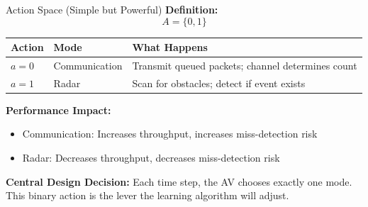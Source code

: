 \documentclass{beamer}
\begin{document}
\begin{frame}{Action Space (Simple but Powerful)}
  \textbf{Definition:}
  $$A = \{0, 1\}$$

  \vspace{0.2cm}
  \scriptsize
  \begin{center}
    \begin{tabular}{|p{1.2cm}|p{1.8cm}|p{4.2cm}|}
      \hline
      \textbf{Action} & \textbf{Mode} & \textbf{What Happens} \\
      \hline
      $a = 0$ & Communication & Transmit queued packets; channel determines count \\
      \hline
      $a = 1$ & Radar & Scan for obstacles; detect if event exists \\
      \hline
    \end{tabular}
  \end{center}

  \vspace{0.15cm}
  \normalsize
  \textbf{Performance Impact:}
  \small
  \begin{itemize}
    \setlength{\itemsep}{0.05cm}
    \item Communication: Increases throughput, increases miss-detection risk
    \item Radar: Decreases throughput, decreases miss-detection risk
  \end{itemize}

  \vspace{0.1cm}
  \small\textbf{Central Design Decision:} Each time step, the AV chooses exactly one mode. This binary action is the lever the learning algorithm will adjust.

  \normalsize
\end{frame}
\end{document}
